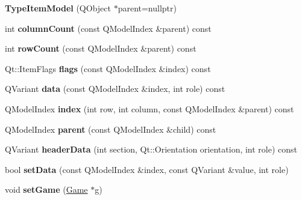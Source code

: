 \begin{DoxyCompactItemize}
\item 
\hypertarget{class_type_item_model_a108cfb2528711b687b9b0c15880b766d}{{\bfseries \-Type\-Item\-Model} (\-Q\-Object $\ast$parent=nullptr)}\label{class_type_item_model_a108cfb2528711b687b9b0c15880b766d}

\item 
\hypertarget{class_type_item_model_a57cef0a628dafeef516a81233e7010b3}{int {\bfseries column\-Count} (const \-Q\-Model\-Index \&parent) const }\label{class_type_item_model_a57cef0a628dafeef516a81233e7010b3}

\item 
\hypertarget{class_type_item_model_a689148d85b1586617c3125a9c4ef5f13}{int {\bfseries row\-Count} (const \-Q\-Model\-Index \&parent) const }\label{class_type_item_model_a689148d85b1586617c3125a9c4ef5f13}

\item 
\hypertarget{class_type_item_model_a01a5d3115ec4282ea6ac98ceafd4b386}{\-Qt\-::\-Item\-Flags {\bfseries flags} (const \-Q\-Model\-Index \&index) const }\label{class_type_item_model_a01a5d3115ec4282ea6ac98ceafd4b386}

\item 
\hypertarget{class_type_item_model_a2d1957a8b511de7f6c324e92cec767ac}{\-Q\-Variant {\bfseries data} (const \-Q\-Model\-Index \&index, int role) const }\label{class_type_item_model_a2d1957a8b511de7f6c324e92cec767ac}

\item 
\hypertarget{class_type_item_model_a86a11d88b6fde64923f683033478f15e}{\-Q\-Model\-Index {\bfseries index} (int row, int column, const \-Q\-Model\-Index \&parent) const }\label{class_type_item_model_a86a11d88b6fde64923f683033478f15e}

\item 
\hypertarget{class_type_item_model_aa5ba32873ce3479effa833fcb88e12af}{\-Q\-Model\-Index {\bfseries parent} (const \-Q\-Model\-Index \&child) const }\label{class_type_item_model_aa5ba32873ce3479effa833fcb88e12af}

\item 
\hypertarget{class_type_item_model_a58745f2062586349fc312afb792cc85e}{\-Q\-Variant {\bfseries header\-Data} (int section, \-Qt\-::\-Orientation orientation, int role) const }\label{class_type_item_model_a58745f2062586349fc312afb792cc85e}

\item 
\hypertarget{class_type_item_model_a652f8f9324f96faa3a0ba0118d157a6e}{bool {\bfseries set\-Data} (const \-Q\-Model\-Index \&index, const \-Q\-Variant \&value, int role)}\label{class_type_item_model_a652f8f9324f96faa3a0ba0118d157a6e}

\item 
\hypertarget{class_type_item_model_a6a52d9f08010bf7535a6280ce5bf6ba4}{void {\bfseries set\-Game} (\hyperlink{class_game}{\-Game} $\ast$g)}\label{class_type_item_model_a6a52d9f08010bf7535a6280ce5bf6ba4}

\end{DoxyCompactItemize}


